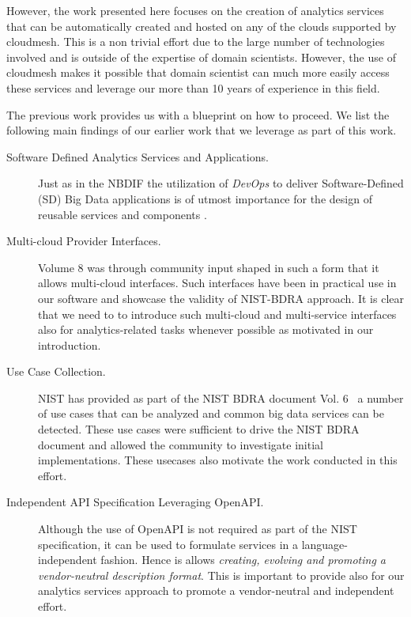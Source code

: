 However, the work presented here focuses on the creation of analytics services that can be automatically created and hosted on any of the clouds supported by cloudmesh. This is a non trivial effort due to the large number of technologies involved and is outside of the expertise of domain scientists. However, the use of cloudmesh makes it possible that domain scientist can much more easily access these services and leverage our more than 10 years of experience in this field.

The previous work provides us with a blueprint on how to proceed.  We list the following main findings of our earlier work that we leverage as part of this work.

\begin{description}
  
\item[Software Defined Analytics Services and Applications.] Just as
  in the NBDIF the utilization of \emph{DevOps} to deliver
  Software-Defined (SD) Big Data applications is of
 utmost importance for the design of reusable services and components \cite{cloudmesh-manual,bigdata-stack-1,bigdata-stack-2}. 
  
\item[Multi-cloud Provider Interfaces.] Volume 8 was through community
  input shaped in such a form that it allows multi-cloud
  interfaces. Such interfaces have been in practical use in our
  software and showcase the validity of NIST-BDRA approach. It is
  clear that we need to to introduce such multi-cloud and multi-service
  interfaces also for analytics-related tasks whenever possible as motivated in our introduction. 

\item[Use Case Collection.] NIST has provided as part of the NIST BDRA
  document Vol. 6~\cite{nist-v6} a number of use cases that can be
  analyzed and common big data services can be detected. These use
  cases were sufficient to drive the NIST BDRA document \cite{nist-v6}
  and allowed the community to investigate initial implementations. These usecases also motivate the work conducted in this effort.

\item[Independent API Specification Leveraging OpenAPI.] Although the
  use of OpenAPI \cite{openapi,openapi-tools} is not required as part
  of the NIST specification, it can be used to formulate services in a
  language-independent fashion. Hence is allows {\em creating, evolving
  and promoting a vendor-neutral description format}. This is 
  important to provide also for our analytics services approach to
  promote a vendor-neutral and independent effort.


\end{description}
